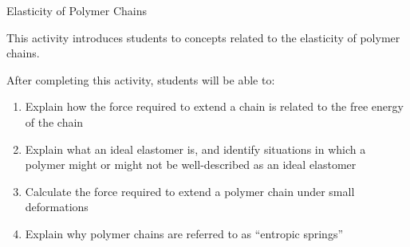 %
%
%
%

\renewcommand{\figpath}{content/polymphys/chain-confs/chain-elasticity/figs}
\renewcommand{\labelbase}{chain-elasticity}

\begin{activity}{Elasticity of Polymer Chains}
\label{\labelbase}

\begin{instructornotes}

	This activity introduces students to concepts related to the elasticity of polymer chains.
	
	After completing this activity, students will be able to:
			\begin{enumerate}
				\item Explain how the force required to extend a chain is related to the free energy of the chain
				\item Explain what an ideal elastomer is, and identify situations in which a polymer might or might not be well-described as an ideal elastomer
				\item Calculate the force required to extend a polymer chain under small deformations
				\item Explain why polymer chains are referred to as ``entropic springs''
			\end{enumerate}
	
			

\end{instructornotes}
\end{activity}
